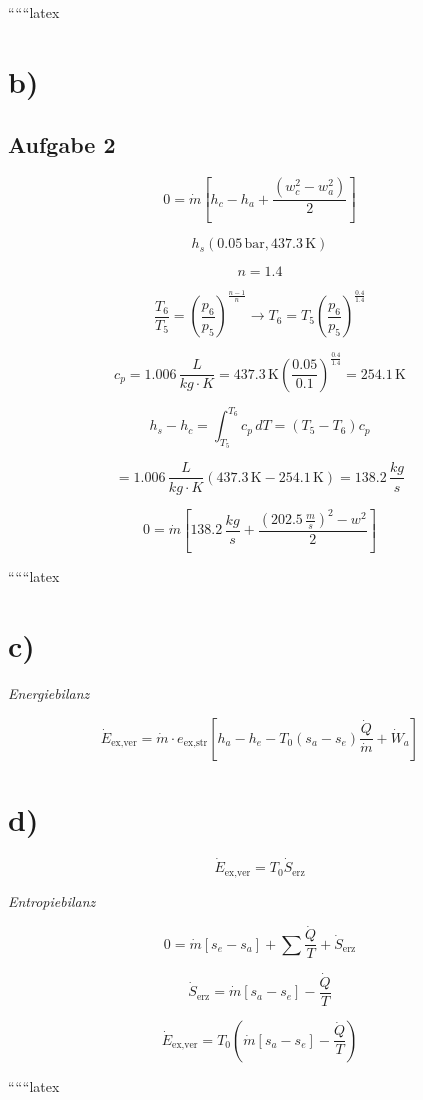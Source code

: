 ``````latex

\section*{b)}

\subsection*{Aufgabe 2}

\[
0 = \dot{m} \left[ h_c - h_a + \frac{\left( w_c^2 - w_a^2 \right)}{2} \right]
\]

\[
h_s (0.05 \, \text{bar}, 437.3 \, \text{K})
\]

\[
n = 1.4
\]

\[
\frac{T_6}{T_5} = \left( \frac{p_6}{p_5} \right)^{\frac{n-1}{n}} \rightarrow T_6 = T_5 \left( \frac{p_6}{p_5} \right)^{\frac{0.4}{1.4}}
\]

\[
c_p = 1.006 \, \frac{L}{kg \cdot K} = 437.3 \, \text{K} \left( \frac{0.05}{0.1} \right)^{\frac{0.4}{1.4}} = 254.1 \, \text{K}
\]

\[
h_s - h_c = \int_{T_5}^{T_6} c_p \, dT = (T_5 - T_6) c_p
\]

\[
= 1.006 \, \frac{L}{kg \cdot K} (437.3 \, \text{K} - 254.1 \, \text{K}) = 138.2 \, \frac{kg}{s}
\]

\[
0 = \dot{m} \left[ 138.2 \, \frac{kg}{s} + \frac{\left( 202.5 \, \frac{m}{s} \right)^2 - w^2}{2} \right]
\]

``````latex

\section*{c)}
\textit{Energiebilanz}

\[
\dot{E}_{\text{ex,ver}} = \dot{m} \cdot e_{\text{ex,str}} \left[ h_a - h_e - T_0 (s_a - s_e) \frac{\dot{Q}}{\dot{m}} + \dot{W}_a \right]
\]

\section*{d)}
\[
\dot{E}_{\text{ex,ver}} = T_0 \dot{S}_{\text{erz}}
\]

\textit{Entropiebilanz}

\[
0 = \dot{m} [s_e - s_a] + \sum \frac{\dot{Q}}{T} + \dot{S}_{\text{erz}}
\]

\[
\dot{S}_{\text{erz}} = \dot{m} [s_a - s_e] - \frac{\dot{Q}}{T}
\]

\[
\dot{E}_{\text{ex,ver}} = T_0 \left( \dot{m} [s_a - s_e] - \frac{\dot{Q}}{T} \right)
\]

``````latex


